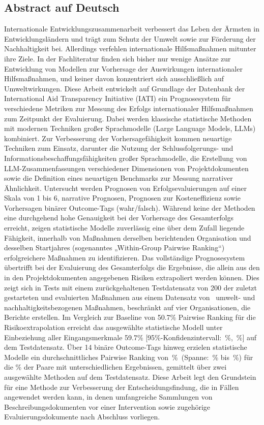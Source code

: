 \documentclass[12pt,a4paper]{article}
\begin{document}
\clearpage
\subsection*{Abstract auf Deutsch}
Internationale Entwicklungszusammenarbeit verbessert das Leben der Ärmsten in Entwicklungsländern und trägt zum Schutz der Umwelt sowie zur Förderung der Nachhaltigkeit bei. Allerdings verfehlen internationale Hilfsmaßnahmen mitunter ihre Ziele. In der Fachliteratur finden sich bisher nur wenige Ansätze zur Entwicklung von Modellen zur Vorhersage der Auswirkungen internationaler Hilfsmaßnahmen, und keiner davon konzentriert sich ausschließlich auf Umweltwirkungen. Diese Arbeit entwickelt auf Grundlage der Datenbank der International Aid Transparency Initiative (IATI) ein Prognosesystem für verschiedene Metriken zur Messung des Erfolgs internationaler Hilfsmaßnahmen zum Zeitpunkt der Evaluierung. Dabei werden klassische statistische Methoden mit modernen Techniken großer Sprachmodelle (Large Language Models, LLMs) kombiniert. Zur Verbesserung der Vorhersagefähigkeit kommen neuartige Techniken zum Einsatz, darunter die Nutzung der Schlussfolgerungs- und Informationsbeschaffungsfähigkeiten großer Sprachmodelle, die Erstellung von LLM-Zusammenfassungen verschiedener Dimensionen von Projektdokumenten sowie die Definition eines neuartigen Benchmarks zur Messung narrativer Ähnlichkeit. Untersucht werden Prognosen von Erfolgsevaluierungen auf einer Skala von 1 bis 6, narrative Prognosen, Prognosen zur Kosteneffizienz sowie Vorhersagen binärer Outcome-Tags (wahr/falsch). Während keine der Methoden eine durchgehend hohe Genauigkeit bei der Vorhersage des Gesamterfolgs erreicht, zeigen statistische Modelle zuverlässig eine über dem Zufall liegende Fähigkeit, innerhalb von Maßnahmen derselben berichtenden Organisation und desselben Startjahres (sogenanntes „Within-Group Pairwise Ranking“) erfolgreichere Maßnahmen zu identifizieren. Das vollständige Prognosesystem übertrifft bei der Evaluierung des Gesamterfolgs die Ergebnisse, die allein aus den in den Projektdokumenten angegebenen Risiken extrapoliert werden können. Dies zeigt sich in Tests mit einem zurückgehaltenen Testdatensatz von 200 der zuletzt gestarteten und evaluierten Maßnahmen aus einem Datensatz von \NOverallRatings\ umwelt- und nachhaltigkeitsbezogenen Maßnahmen, beschränkt auf vier Organisationen, die Berichte erstellen. Im Vergleich zur Baseline von 50.7\% Pairwise Ranking für die Risikoextrapolation erreicht das ausgewählte statistische Modell unter Einbeziehung aller Eingangsmerkmale 59.7\% [95\%-Konfidenzintervall: \PairwiseCILow\,\%, \PairwiseCIHigh\,\%] auf dem Testdatensatz. Über 14 binäre Outcome-Tags hinweg erzielen statistische Modelle ein durchschnittliches Pairwise Ranking von \OutcomeTagPairwiseAvg\,\%\ (Spanne: \OutcomeTagPairwiseMin\,\% bis \OutcomeTagPairwiseMax\,\%) für die \DifferingOutcomePairsFrac\% der Paare mit unterschiedlichen Ergebnissen, gemittelt über zwei ausgewählte Methoden auf dem Testdatensatz. Diese Arbeit legt den Grundstein für eine Methode zur Verbesserung der Entscheidungsfindung, die in Fällen angewendet werden kann, in denen umfangreiche Sammlungen von Beschreibungsdokumenten vor einer Intervention sowie zugehörige Evaluierungsdokumente nach Abschluss vorliegen.
\end{document}
